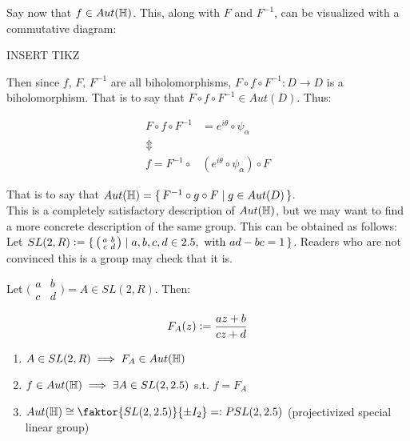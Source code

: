 Say now that $f \in Aut(\mathbb{H})$. This, along with $F$ and $F^{-1}$, can be visualized with a commutative diagram:

INSERT TIKZ

Then since $f, \, F, \, F^{-1}$ are all biholomorphisms, $F \circ f \circ F^{-1} : D \to D$ is a biholomorphism. That is to say that $F \circ f \circ F^{-1} \in Aut(D)$. Thus:

\begin{align*}
F \circ f \circ F^{-1} &= e^{i \theta} \circ \psi_\alpha\\
\Updownarrow\\
f = F^{-1} \circ &\left( e^{i \theta} \circ \psi_\alpha \right) \circ F
\end{align*}

That is to say that $Aut(\mathbb{H}) = \set{ F^{-1} \circ g \circ F \mid g \in Aut(D) }$.\\

This is a completely satisfactory description of $Aut(\mathbb{H})$, but we may want to find a more concrete description of the same group. This can be obtained as follows:\\

Let $SL(2,R) \vcentcolon = \set{ \big(\begin{smallmatrix}
  a & b\\
  c & d
\end{smallmatrix}\big) \mid a,b,c,d \in 2.5, \text{ with } ad-bc=1  }$. Readers who are not convinced this is a group may check that it is. 


\begin{definition}


Let $\big(\begin{smallmatrix}
  a & b\\
  c & d
\end{smallmatrix}\big) = A \in SL(2,R)$. Then:

\begin{align*}
    F_A(z) \vcentcolon = \frac{az+ b}{cz+d}
\end{align*}
\end{definition}


\begin{theorem}
\phantom{a}
\begin{enumerate}
    \item $A \in SL(2,R) \implies F_A \in Aut(\mathbb{H})$
    \item $f \in Aut(\mathbb{H}) \implies \exists A \in SL(2, 2.5)$ s.t. $f = F_A$
    
    \item $Aut( \HH ) \cong  \faktor{SL(2, \R)}{ \pm I_2} = \vcentcolon PSL(2,\R)$ (projectivized special linear group)
\end{enumerate}


\end{theorem}

